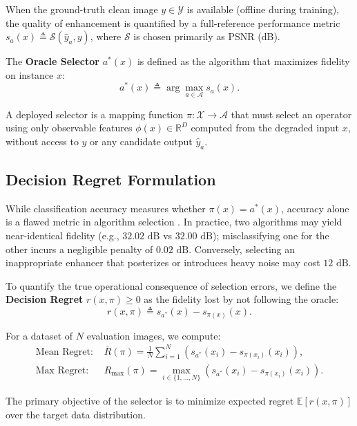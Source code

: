 \documentclass[journal]{IEEEtran}
\begin{document}
When the ground-truth clean image $y \in \mathcal{Y}$ is available (offline during training), the quality of enhancement is quantified by a full-reference performance metric $s_a(x) \triangleq \mathcal{S}(\hat{y}_a, y)$, where $\mathcal{S}$ is chosen primarily as PSNR (dB).

The \textbf{Oracle Selector} $a^*(x)$ is defined as the algorithm that maximizes fidelity on instance $x$:
\begin{equation}
a^*(x) \triangleq \arg\max_{a \in \mathcal{A}} s_a(x).
\label{eq:oracle_definition}
\end{equation}

A deployed selector is a mapping function $\pi: \mathcal{X} \to \mathcal{A}$ that must select an operator using only observable features $\phi(x) \in \mathbb{R}^D$ computed from the degraded input $x$, without access to $y$ or any candidate output $\hat{y}_a$.

\subsection{Decision Regret Formulation}
While classification accuracy measures whether $\pi(x) = a^*(x)$, accuracy alone is a flawed metric in algorithm selection \cite{bischl2016aslib}. In practice, two algorithms may yield near-identical fidelity (e.g., $32.02\text{ dB}$ vs $32.00\text{ dB}$); misclassifying one for the other incurs a negligible penalty of $0.02\text{ dB}$. Conversely, selecting an inappropriate enhancer that posterizes or introduces heavy noise may cost $12\text{ dB}$.

To quantify the true operational consequence of selection errors, we define the \textbf{Decision Regret} $r(x, \pi) \ge 0$ as the fidelity lost by not following the oracle:
\begin{equation}
r(x, \pi) \triangleq s_{a^*}(x) - s_{\pi(x)}(x).
\label{eq:regret_definition}
\end{equation}

For a dataset of $N$ evaluation images, we compute:
\begin{align}
\text{Mean Regret: } & \bar{R}(\pi) = \frac{1}{N} \sum_{i=1}^N \left( s_{a^*}(x_i) - s_{\pi(x_i)}(x_i) \right), \label{eq:mean_regret} \\
\text{Max Regret: } & R_{\max}(\pi) = \max_{i \in \{1,\dots,N\}} \left( s_{a^*}(x_i) - s_{\pi(x_i)}(x_i) \right). \label{eq:max_regret}
\end{align}

The primary objective of the selector is to minimize expected regret $\mathbb{E}[r(x, \pi)]$ over the target data distribution.
\end{document}
